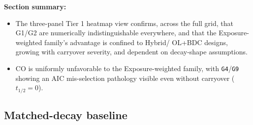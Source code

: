 \documentclass[
  11pt,
]{article}
\providecommand{\tightlist}{%
  \setlength{\itemsep}{0pt}\setlength{\parskip}{0pt}}
\begin{document}
\textbf{Section summary:}

\begin{itemize}
\tightlist
\item
  The three-panel Tier 1 heatmap view confirms, across the full grid,
  that G1/G2 are numerically indistinguishable everywhere, and that
  the Exposure-weighted family's advantage is confined to Hybrid/
  OL+BDC designs, growing with carryover severity, and dependent on
  decay-shape assumptions.
\item
  CO is uniformly unfavorable to the Exposure-weighted family, with
  \texttt{G4}/\texttt{G9} showing an AIC mis-selection pathology visible even
  without carryover (\(t_{1/2}=0\)).
\end{itemize}

\subsection{Matched-decay baseline}\label{matched-decay-baseline}
\end{document}
